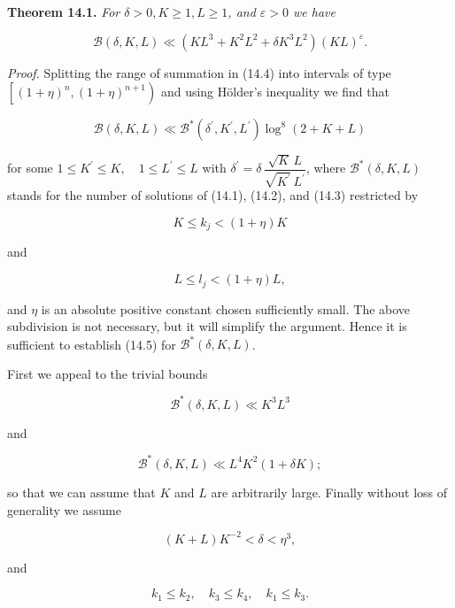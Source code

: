 \documentclass[10pt]{article}
\begin{document}
\medskip\noindent\textbf{Theorem 14.1.} \textit{For $\delta>0, K \geqslant 1, L \geqslant 1$, and $\varepsilon>0$ we have}

\begin{equation*}
\mathscr{B}(\delta, K, L) \ll\left(K L^{3}+K^{2} L^{2}+\delta K^{3} L^{2}\right)(K L)^{\varepsilon} . \tag{14.5}
\end{equation*}


\medskip\noindent\textit{Proof.} Splitting the range of summation in (14.4) into intervals of type $\left[(1+\eta)^{n},(1+\eta)^{n+1}\right)$ and using Hölder's inequality we find that

$$
\mathscr{B}(\delta,K,L)\ll\mathscr{B}^{*}(\delta^{\prime},K^{\prime},L^{\prime}) \log ^{8}(2+K+L)
$$

for some $1 \leqslant K^{\prime} \leqslant K, \quad 1 \leqslant L^{\prime} \leqslant L$ with $\delta^{\prime}=\delta\,\dfrac{\sqrt{K}\,L}{\sqrt{K^{\prime}}\,L^{\prime}}$, where $\mathscr{B}^{*}(\delta, K, L)$ stands for the number of solutions of (14.1), (14.2), and (14.3) restricted by


\begin{equation*}
K \leqslant k_{j}<(1+\eta) K \tag{14.6}
\end{equation*}


and


\begin{equation*}
L \leqslant l_{j}<(1+\eta) L, \tag{14.7}
\end{equation*}


and $\eta$ is an absolute positive constant chosen sufficiently small. The above subdivision is not necessary, but it will simplify the argument. Hence it is sufficient to establish (14.5) for $\mathscr{B}^{*}(\delta, K, L)$.

First we appeal to the trivial bounds

$$
\mathscr{B}^{*}(\delta,K,L)\ll K^{3}L^{3}
$$

and

$$
\mathscr{B}^{*}(\delta, K, L) \ll L^{4} K^{2}(1+\delta K) ;
$$

so that we can assume that $K$ and $L$ are arbitrarily large. Finally without loss of generality we assume


\begin{equation*}
(K+L) K^{-2}<\delta<\eta^{3}, \tag{14.8}
\end{equation*}


and


\begin{equation*}
k_{1} \leqslant k_{2}, \quad k_{3} \leqslant k_{4}, \quad k_{1} \leqslant k_{3} . \tag{14.9}
\end{equation*}
\end{document}
